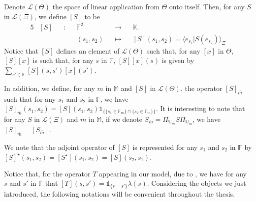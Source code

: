\begin{de}
Denote $\mathcal{L}(\Theta)$ the space of linear application from $\Theta$ onto itself.
Then, for any $S$ in $\mathcal{L}(\Xi)$, we define $[S]$ to be
\begin{alignat*}{5}
& [S] && : && \mathds{F}^{2} && \rightarrow && \mathds{K}. \\
& && && (s_{1}, s_{2}) && \mapsto && [S](s_{1}, s_{2}) = \langle e_{s_{1}} \vert S(e_{s_{2}}) \rangle_{\Xi}
\end{alignat*}
Notice that $[S]$ defines an element of $\mathcal{L}(\Theta)$ such that, for any $[x]$ in $\Theta$, $[S][x]$ is such that, for any $s$ in $\mathds{F}$, $[S][x](s)$ is given by $\sum_{s' \in \mathds{F}} [S](s, s')[x](s')$.

In addition, we define, for any $m$ in $\mathds{M}$ and $[S]$ in $\mathcal{L}(\Theta)$, the operator $[S]_{\overline{m}}$ such that for any $s_{1}$ and $s_{2}$ in $\mathds{F}$, we have $[S]_{\overline{m}}(s_{1}, s_{2}) = [S](s_{1}, s_{2}) \mathds{1}_{\{ \{s_{1} \in \mathds{F}_{m}\} \cap \{s_{2}  \in \mathds{F}_{m}\} \}}$.
It is interesting to note that for any $S$ in $\mathcal{L}(\Xi)$ and $m$ in $\mathds{M}$, if we denote $S_{\overline{m}} = \Pi_{\mathds{U}_{\overline{m}}} S \Pi_{\mathds{U}_{\overline{m}}}$, we have $[S]_{\overline{m}} = [S_{\overline{m}}]$.

We note that the adjoint operator of $[S]$ is represented for any $s_{1}$ and $s_{2}$ in $\mathds{F}$ by $[S]^{\star}(s_{1}, s_{2}) = [S^{\star}](s_{1}, s_{2}) = \overline{[S](s_{2}, s_{1})}$.
\assEnd
\end{de}

Notice that, for the operator $T$ appearing in our model, due to , we have for any $s$ and $s'$ in $\mathds{F}$ that $[T](s, s') = \mathds{1}_{\{s = s'\}} \lambda(s)$.
Considering the objects we just introduced, the following notations will be convenient throughout the thesis.


